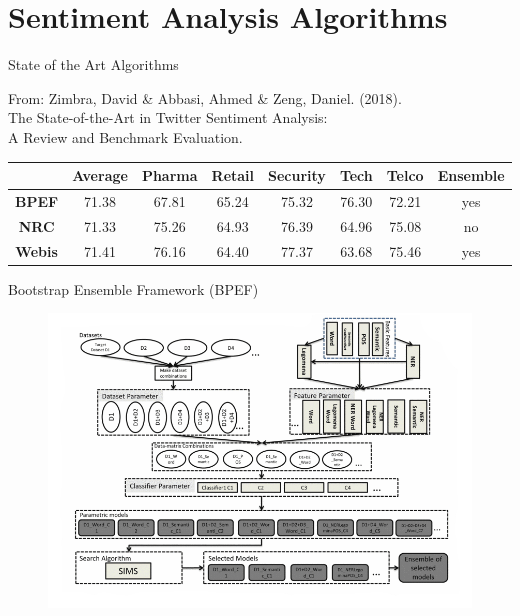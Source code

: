 \documentclass{beamer}
\begin{document}
	\section{Sentiment Analysis Algorithms}
	
	\begin{frame}{State of the Art Algorithms}
		
		From: Zimbra, David \& Abbasi, Ahmed \& Zeng, Daniel. (2018).\\ The State-of-the-Art in Twitter Sentiment Analysis:\\ A Review and Benchmark Evaluation.
		
		\begin{table}
			\centering
			\scriptsize
			\begin{tabular}{| c || c | c | c | c | c | c || c |}
				\hline
				& \textbf{Average} & \textbf{Pharma} & \textbf{Retail} & \textbf{Security} & \textbf{Tech} & \textbf{Telco} & \textbf{Ensemble}\\
				\hline
				\textbf{BPEF} & 71.38 & 67.81 & 65.24 & 75.32 & 76.30 & 72.21 & yes\\
				\hline
				\textbf{NRC} & 71.33 & 75.26 & 64.93 & 76.39 & 64.96 & 75.08 & no\\
				\hline
				\textbf{Webis} & 71.41 & 76.16 & 64.40 & 77.37 & 63.68 & 75.46 & yes\\
				\hline
			\end{tabular}
		\end{table}
	
	
		

		
	\end{frame}

	\begin{frame}{Bootstrap Ensemble Framework (BPEF)}
		
		\begin{figure}
			\centering
			\vspace{-5mm}
			\includegraphics[width=\linewidth]{figures/bpef.png}
		\end{figure}
				
	\end{frame}
\end{document}
